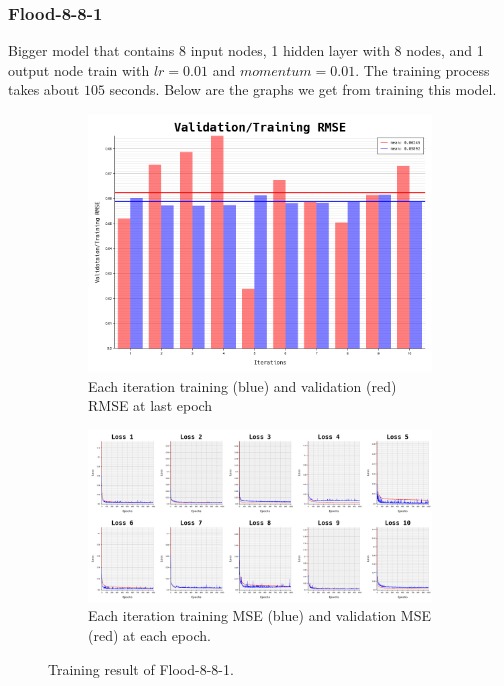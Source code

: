 \documentclass{article}
\begin{document}
\newpage
\subsubsection*{Flood-8-8-1}
Bigger model that contains 8 input nodes, 1 hidden layer with 8 nodes, and 1 output node train with $lr = 0.01$ and $momentum = 0.01$.
The training process takes about $105$ seconds.
Below are the graphs we get from training this model. 
\begin{figure}[ht]
	\begin{subfigure}{\textwidth}
		\centering
		\includegraphics[scale=0.3]{flood-8-8-1/cv_l}
		\caption{Each iteration training (blue) and validation (red) RMSE at last epoch}
		\label{fig:6a}
	\end{subfigure}
	\begin{subfigure}{\textwidth}
		\includegraphics[width=\textwidth]{flood-8-8-1/loss}
		\caption{Each iteration training MSE (blue) and validation MSE (red) at each epoch.}
		\label{fig:6b}
	\end{subfigure}
	\caption{Training result of Flood-8-8-1.}
	\label{fig:6}
\end{figure}
\FloatBarrier
\end{document}
